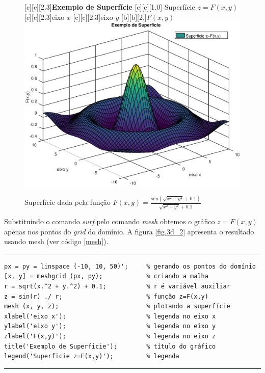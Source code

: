 \begin{figure}[htpb]
\begin{center} 
[c][c][2.3]{\textbf{Exemplo de Superfície}}
[c][c][1.0]{\hspace{0.3cm} Superfície $z=F(x,y)$}
[c][c][2.3]{eixo $x$}
[c][c][2.3]{eixo $y$}
[b][b][2.]{$F(x,y)$}
\includegraphics*[angle=0,scale=0.55]{imagens/cap2/superficie.eps}
\caption{Superfície dada pela função $F(x,y)=\frac{sen(\sqrt{x^2+y^2}+0.1)}{\sqrt{x^2+y^2}+0.1}$} 
\label{fig.3d_1}
\end{center}
\end{figure}

Substituindo o comando {\it surf} pelo comando {\it mesh} obtemos o gráfico $z=F(x,y)$ apenas nos pontos do {\it grid} do domínio. A figura \ref{fig.3d_2} apresenta o resultado usando mesh (ver código  \ref{mesh}).


\begin{Codigo}[htpb]
\noindent\rule{13cm}{1.pt}
\begin{verbatim}
px = py = linspace (-10, 10, 50)';     % gerando os pontos do domínio
[x, y] = meshgrid (px, py);            % criando a malha 
r = sqrt(x.^2 + y.^2) + 0.1;           % r é variável auxiliar
z = sin(r) ./ r;                       % função z=F(x,y) 
mesh (x, y, z);                        % plotando a superfície
xlabel('eixo x');                      % legenda no eixo x
ylabel('eixo y');                      % legenda no eixo y
zlabel('F(x,y)');                      % legenda no eixo z
title('Exemplo de Superficie');        % título do gráfico 
legend('Superficie z=F(x,y)');         % legenda
\end{verbatim}
\vspace{-0.5cm}
\caption{Código utilizado para gerar a figura \ref{fig.3d_2} } 
\noindent\rule{13cm}{1.pt}
\label{mesh}
\end{Codigo}

